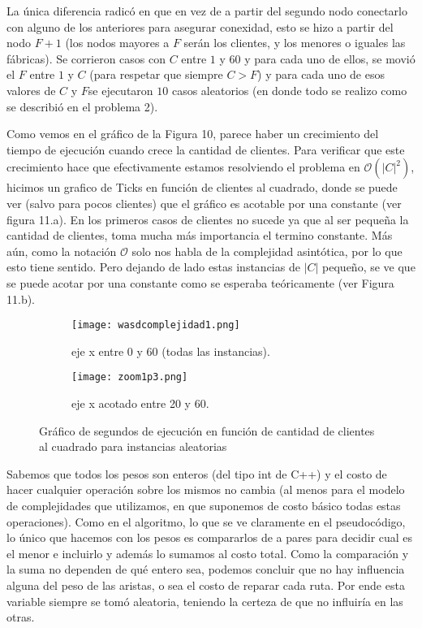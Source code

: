 \documentclass[A4paper,oneside,fleqn,11pt]{article}
\theoremstyle{definition}
\begin{document}
 La única diferencia radicó en que en vez de a partir del segundo nodo conectarlo con alguno de los anteriores para asegurar conexidad, esto se hizo a partir del nodo $F+1$ (los nodos mayores a $F$ serán los clientes, y los menores o iguales las fábricas). Se corrieron casos con $C$ entre $1$ y $60$ y para cada uno de ellos, se movió el $F$ entre $1$ y $C$ (para respetar que siempre $C>F$) y para cada uno de esos valores de $C$ y $F$se ejecutaron $10$ casos aleatorios (en donde todo se realizo como se describió en el problema 2).

Como vemos en el gráfico de la Figura 10, parece haber un crecimiento del tiempo de ejecución cuando crece la cantidad de clientes. Para verificar que este crecimiento hace que efectivamente estamos resolviendo el problema en $\mathcal{O}(|C|^2)$, hicimos un grafico de Ticks en función de clientes al cuadrado, donde se puede ver (salvo para pocos clientes) que el gráfico es acotable por una constante (ver figura 11.a). En los primeros casos de clientes no sucede ya que al ser pequeña la cantidad de clientes, toma mucha más importancia el termino constante. Más aún, como la notación $\mathcal{O}$ solo nos habla de la complejidad asintótica, por lo que esto tiene sentido. Pero dejando de lado estas instancias de $	|C|$ pequeño, se ve que se puede acotar por una constante como se esperaba teóricamente (ver Figura 11.b).


\begin{figure}[H] %
    \begin{subfigure}[b]{0.45\textwidth}
        \texttt{[image: wasdcomplejidad1.png]}
        \caption[center]{eje x entre 0 y 60 (todas las instancias).}
        \label{ni se pa que sirve esto}
    \end{subfigure}
    \begin{subfigure}[b]{0.45\textwidth}
        \texttt{[image: zoom1p3.png]}
        \caption{eje x acotado entre 20 y 60.}
        \label{ni se pa que sirve esto}
    \end{subfigure}
    \caption{Gráfico de segundos de ejecución en función de cantidad de clientes al cuadrado para instancias aleatorias}
\end{figure}


\normalsize

Sabemos que todos los pesos son enteros (del tipo int de C++) y el costo de hacer cualquier operación sobre los mismos no cambia (al menos para el modelo de complejidades que utilizamos, en que suponemos de costo básico todas estas operaciones). Como en el algoritmo, lo que se ve claramente en el pseudocódigo, lo único que hacemos con los pesos es compararlos de a pares para decidir cual es el menor e incluirlo y además lo sumamos al costo total. Como la comparación y la suma no dependen de qué entero sea, podemos concluir que no hay influencia alguna del peso de las aristas, o sea el costo de reparar cada ruta. Por ende esta variable siempre se tomó aleatoria, teniendo la certeza de que no influiría en las otras. 
\end{document}
